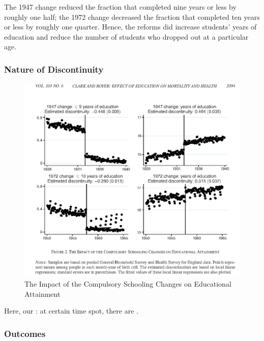             The 1947 change reduced the fraction that completed nine years or less by roughly one half; the 1972 change decreased the fraction that completed ten years or less by roughly one quarter. Hence, the reforms did increase students' years of education and reduce the number of students who dropped out at a particular age.

        \subsubsection{Nature of Discontinuity}
            \begin{figure}[H]
                \centering
                \includegraphics[width=5in]{images/ch3/36.png}
                \caption{The Impact of the Compulsory Schooling Changes on Educational Attainment}
            \end{figure}
            
            Here, our : at certain time spot, there are .
    

        \subsubsection{Outcomes}


